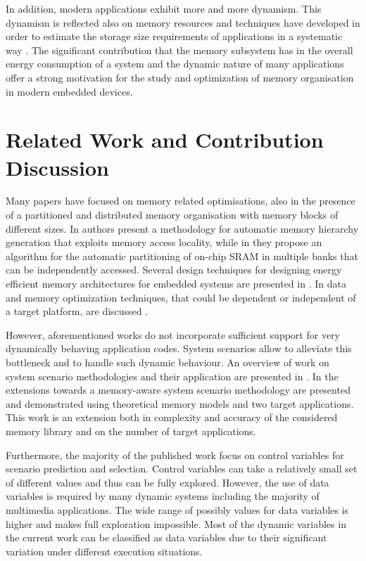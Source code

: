 \documentclass[a4paper,conference]{IEEEtran}
\begin{document}
In addition, modern applications exhibit more and more dynamism. This dynamism is reflected also on memory resources and techniques have developed in order to estimate the storage size requirements of applications in a systematic way \cite{Ang13}. The significant contribution that the memory subsystem has in the overall energy consumption of a system and the dynamic nature of many applications offer a strong motivation for the study and optimization of memory organisation in modern embedded devices.

\section{Related Work and Contribution Discussion}
\label{sec:related}

Many papers have focused on memory related optimisations, also in the presence of a partitioned and distributed memory organisation with memory blocks of different sizes. In \cite{Ben00b} authors present a methodology for automatic memory hierarchy generation that exploits memory access locality, while in \cite{Ben00c} they propose an algorithm for the automatic partitioning of on-chip SRAM in multiple banks that can be independently accessed. Several design techniques for designing energy efficient memory architectures for embedded systems are presented in \cite{Mac02}. In \cite{Pgk01} data and memory optimization techniques, that could be dependent or independent of a target platform, are discussed . 

However, aforementioned works do not incorporate sufficient support for very dynamically behaving application codes. System scenarios allow to alleviate this bottleneck and to handle such dynamic behaviour. An overview of work on system scenario methodologies and their application are presented in \cite{Gheorghita2007}. In \cite{Fil12} the extensions towards a memory-aware system scenario methodology are presented and demonstrated using theoretical memory models and two target applications. This work is an extension both in complexity and accuracy of the considered memory library and on the number of target applications. 

Furthermore, the majority of the published work focus on control variables for scenario prediction and selection. Control variables can take a relatively small set of different values and thus can be fully explored. However, the use of data variables \cite{Elena2010} is required by many dynamic systems including the majority of multimedia applications. The wide range of possibly values for data variables is higher and makes full exploration impossible. Most of the dynamic variables in the current work can be classified as data variables due to their significant variation under different execution situations. 
\end{document}
